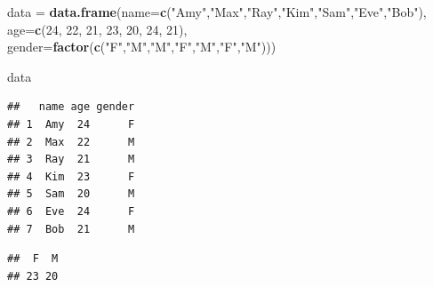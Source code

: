 \documentclass[
]{book}
\newenvironment{Shaded}{\begin{snugshade}}{\end{snugshade}}
\newcommand{\DataTypeTok}[1]{\textcolor[rgb]{0.13,0.29,0.53}{#1}}
\newcommand{\DecValTok}[1]{\textcolor[rgb]{0.00,0.00,0.81}{#1}}
\newcommand{\KeywordTok}[1]{\textcolor[rgb]{0.13,0.29,0.53}{\textbf{#1}}}
\newcommand{\NormalTok}[1]{#1}
\newcommand{\OperatorTok}[1]{\textcolor[rgb]{0.81,0.36,0.00}{\textbf{#1}}}
\newcommand{\StringTok}[1]{\textcolor[rgb]{0.31,0.60,0.02}{#1}}
\begin{document}
\begin{Shaded}
\begin{Highlighting}[]
\NormalTok{data =}\StringTok{ }\KeywordTok{data.frame}\NormalTok{(}\DataTypeTok{name=}\KeywordTok{c}\NormalTok{(}\StringTok{"Amy"}\NormalTok{,}\StringTok{"Max"}\NormalTok{,}\StringTok{"Ray"}\NormalTok{,}\StringTok{"Kim"}\NormalTok{,}\StringTok{"Sam"}\NormalTok{,}\StringTok{"Eve"}\NormalTok{,}\StringTok{"Bob"}\NormalTok{), }
                  \DataTypeTok{age=}\KeywordTok{c}\NormalTok{(}\DecValTok{24}\NormalTok{, }\DecValTok{22}\NormalTok{, }\DecValTok{21}\NormalTok{, }\DecValTok{23}\NormalTok{, }\DecValTok{20}\NormalTok{, }\DecValTok{24}\NormalTok{, }\DecValTok{21}\NormalTok{),}
                  \DataTypeTok{gender=}\KeywordTok{factor}\NormalTok{(}\KeywordTok{c}\NormalTok{(}\StringTok{"F"}\NormalTok{,}\StringTok{"M"}\NormalTok{,}\StringTok{"M"}\NormalTok{,}\StringTok{"F"}\NormalTok{,}\StringTok{"M"}\NormalTok{,}\StringTok{"F"}\NormalTok{,}\StringTok{"M"}\NormalTok{))) }

\NormalTok{data}
\end{Highlighting}
\end{Shaded}

\begin{verbatim}
##   name age gender
## 1  Amy  24      F
## 2  Max  22      M
## 3  Ray  21      M
## 4  Kim  23      F
## 5  Sam  20      M
## 6  Eve  24      F
## 7  Bob  21      M
\end{verbatim}

\begin{Shaded}
\end{Shaded}

\begin{verbatim}
##  F  M 
## 23 20
\end{verbatim}

  
\end{document}
